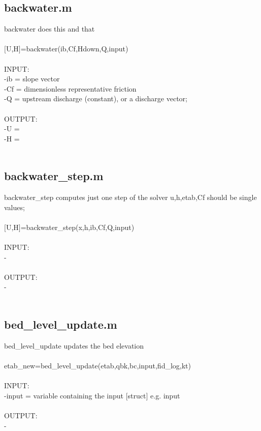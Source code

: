 \subsection{backwater.m}
backwater does this and that \\ 
 \\ 
$[$U,H$]$=backwater(ib,Cf,Hdown,Q,input) \\ 
 \\ 
INPUT: \\ 
   -ib = slope vector \\ 
   -Cf = dimensionless representative friction \\ 
   -Q = upstream discharge (constant), or a discharge vector; \\ 
 \\ 
OUTPUT: \\ 
   -U =  \\ 
   -H =  \\ 
 \\ 
\subsection{backwater\_step.m}
backwater\_step computes just one step of the solver u,h,etab,Cf should be single values; \\ 
 \\ 
$[$U,H$]$=backwater\_step(x,h,ib,Cf,Q,input) \\ 
 \\ 
INPUT: \\ 
   - \\ 
 \\ 
OUTPUT: \\ 
   - \\ 
 \\ 
\subsection{bed\_level\_update.m}
bed\_level\_update updates the bed elevation \\ 
 \\ 
etab\_new=bed\_level\_update(etab,qbk,bc,input,fid\_log,kt) \\ 
 \\ 
INPUT: \\ 
   -input = variable containing the input $[$struct$]$ e.g. input \\ 
 \\ 
OUTPUT: \\ 
   - \\ 
 \\ 
